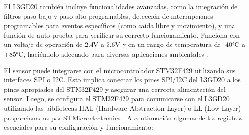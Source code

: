 El L3GD20 también incluye funcionalidades avanzadas, como la integración de filtros paso bajo y paso alto programables, detección de interrupciones programables para eventos específicos (como caída libre y movimiento), y una función de auto-prueba para verificar su correcto funcionamiento. Funciona con un voltaje de operación de 2.4V a 3.6V y en un rango de temperatura de -40°C a +85°C, haciéndolo adecuado para diversas aplicaciones ambientales \cite{L3}.

El sensor puede integrarse con el microcontrolador STM32F429 utilizando sus interfaces SPI o I2C. Esto implica conectar los pines SPI/I2C del L3GD20 a los pines apropiados del STM32F429 y asegurar una correcta alimentación del sensor. Luego, se configura el STM32F429 para comunicarse con el L3GD20 utilizando las bibliotecas HAL (Hardware Abstraction Layer) o LL (Low Layer) proporcionadas por STMicroelectronics \cite{L3}. A continuación algunos de los registros esenciales para su configuración y funcionamiento:

